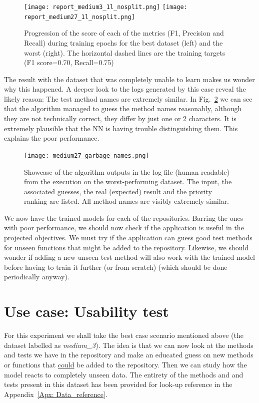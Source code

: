 \documentclass[a4paper, 11pt]{report}
\begin{document}
    \begin{figure}[ht!]
        \centering
        \texttt{[image: report\_medium3\_1l\_nosplit.png]}
        \texttt{[image: report\_medium27\_1l\_nosplit.png]}
        \caption[Train progress of best and worst datasets]{Progression of the score of each of the metrics (F1, Precision and Recall) during training epochs for the best dataset (left) and the worst (right). The horizontal dashed lines are the training targets (F1 score=0.70, Recall=0.75)}
        \label{fig: nosplit_train_pair}
    \end{figure}

    The result with the dataset that was completely unable to learn makes us wonder why this happened. A deeper look to the logs generated by this case reveal the likely reason: The test method names are extremely similar. In Fig.~\ref{fig: medium27_garbage} we can see that the algorithm managed to guess the method names reasonably, although they are not technically correct, they differ by just one or 2 characters. It is extremely plausible that the NN is having trouble distinguishing them. This explains the poor performance.

    \begin{figure}[ht!]
        \centering
        \texttt{[image: medium27\_garbage\_names.png]}
        \caption[Problematic data example]{Showcase of the algorithm outputs in the log file (human readable) from the execution on the worst-performing dataset. The input, the associated guesses, the real (expected) result and the priority ranking are listed. All method names are visibly extremely similar.}
        \label{fig: medium27_garbage}
    \end{figure}

    We now have the trained models for each of the repositories. Barring the ones with poor performance, we should now check if the application is useful in the projected objectives. We must try if the application can guess good test methods for unseen functions that might be added to the repository. Likewise, we should wonder if adding a new unseen test method will also work with the trained model before having to train it further (or from scratch) (which should be done periodically anyway).

    \section{Use case: Usability test}

    For this experiment we shall take the best case scenario mentioned above (the dataset labelled as \textit{medium\_3}). The idea is that we can now look at the methods and tests we have in the repository and make an educated guess on new methods or functions that \underline{could} be added to the repository. Then we can study how the model reacts to completely unseen data. The entirety of the methods and and tests present in this dataset has been provided for look-up reference in the Appendix~\ref{Apx: Data_reference}.
\end{document}
